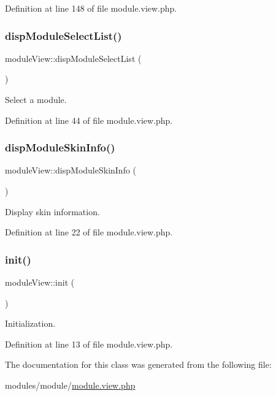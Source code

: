 Definition at line 148 of file module.\+view.\+php.

\mbox{\label{classmoduleView_a801c0978511c936589b76fb609a2778a}} 
\subsubsection{\texorpdfstring{disp\+Module\+Select\+List()}{dispModuleSelectList()}}
{\footnotesize\ttfamily module\+View\+::disp\+Module\+Select\+List (\begin{DoxyParamCaption}{ }\end{DoxyParamCaption})}



Select a module. 



Definition at line 44 of file module.\+view.\+php.

\mbox{\label{classmoduleView_abe0e2fe2a54a48a08c0a208b075b5586}} 
\subsubsection{\texorpdfstring{disp\+Module\+Skin\+Info()}{dispModuleSkinInfo()}}
{\footnotesize\ttfamily module\+View\+::disp\+Module\+Skin\+Info (\begin{DoxyParamCaption}{ }\end{DoxyParamCaption})}



Display skin information. 



Definition at line 22 of file module.\+view.\+php.

\mbox{\label{classmoduleView_a1d511f9c31e82b1d66703287c3834dc0}} 
\subsubsection{\texorpdfstring{init()}{init()}}
{\footnotesize\ttfamily module\+View\+::init (\begin{DoxyParamCaption}{ }\end{DoxyParamCaption})}



Initialization. 



Definition at line 13 of file module.\+view.\+php.



The documentation for this class was generated from the following file\+:\begin{DoxyCompactItemize}
\item 
modules/module/\hyperlink{module_8view_8php}{module.\+view.\+php}\end{DoxyCompactItemize}
